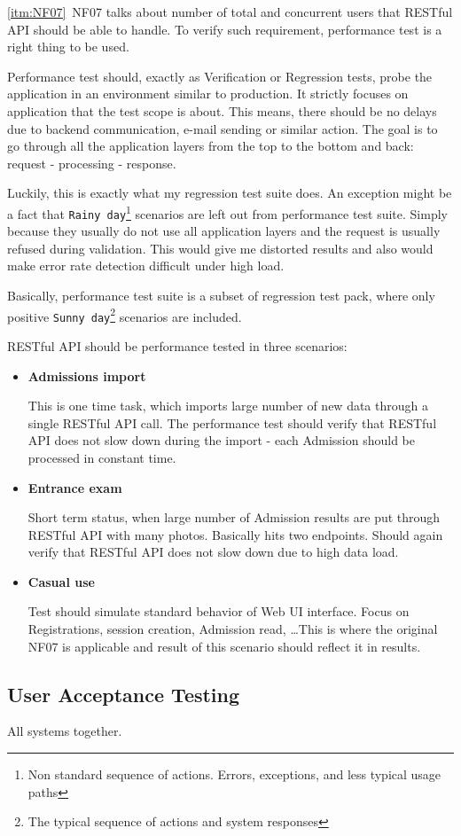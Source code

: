 	\ref{itm:NF07}~NF07 talks about number of total and concurrent users that RESTful API should be able to handle. To
	verify such requirement, performance test is a right thing to be used.
	
	Performance test should, exactly as Verification or Regression tests, probe the application in an environment similar
	to production.
	It strictly focuses on application that the test scope is about. This means, there should be no delays due to backend
	communication, e-mail sending or similar action. The goal is to go through all the application layers from the top to
	the bottom and back: request - processing - response.
	
	Luckily, this is exactly what my regression test suite does. An exception might be a fact that
	\verb|Rainy day|\footnote{Non standard sequence of actions. Errors, exceptions, and less typical usage paths}
	scenarios are left out from performance test suite. Simply because they usually do not use all application layers and the request is usually refused during validation. This would give me distorted results and also would make error rate
	detection difficult under high load.
	
	Basically, performance test suite is a subset of regression test pack, where only positive
	\verb|Sunny day|\footnote{The typical sequence of actions and system responses} scenarios are included.
	
	RESTful API should be performance tested in three scenarios:
	
	\begin{itemize}
		\item \textbf{Admissions import}
		
		This is one time task, which imports large number of new data through a single RESTful API call. The performance test
		should verify that RESTful API does not slow down during the import - each Admission should be processed in constant
		time.
		\item \textbf{Entrance exam}
		
		Short term status, when large number of Admission results are put through RESTful API with many photos. Basically hits
		two endpoints. Should again verify that RESTful API does not slow down due to high data load.
		\item \textbf{Casual use}
		
		Test should simulate standard behavior of Web UI interface. Focus on Registrations, session creation, Admission read,
		\ldots This is where the original NF07 is applicable and result of this scenario should reflect it in results.
	\end{itemize}
	
	\subsection{User Acceptance Testing}
	
	All systems together.